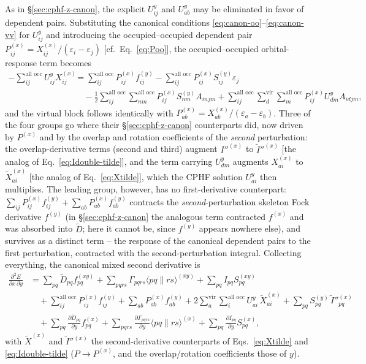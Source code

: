 \documentclass[12pt]{article}
\newcommand{\adb}[2]{\langle #1 \| #2 \rangle}
\newcommand{\vir}{\text{vir}}
\newcommand{\alloc}{\text{all occ}}   %
\begin{document}
As in \S\ref{sec:cphf-z-canon}, the explicit $U^y_{ij}$ and $U^y_{ab}$ may be eliminated in favor of
dependent pairs.  Substituting the canonical conditions \eqref{eq:canon-oo}--\eqref{eq:canon-vv}
for $U^y_{ij}$ and introducing the occupied--occupied dependent pair
$P^{(x)}_{ij}=X^{(x)}_{ij}/(\varepsilon_i-\varepsilon_j)$ [cf.\ Eq.~\eqref{eq:Poo}],
the occupied--occupied orbital-response term becomes
\begin{align}
-\sum_{ij}^{\alloc}U^y_{ij}X^{(x)}_{ij}
&= \sum_{ij}^{\alloc}P^{(x)}_{ij}f^{(y)}_{ij}
- \sum_{ij}^{\alloc}P^{(x)}_{ij}S^{(y)}_{ij}\varepsilon_j
\nonumber\\
&\quad
- \tfrac12\sum_{ij}^{\alloc}\sum_{nm}^{\alloc}P^{(x)}_{ij}S^{(y)}_{nm}A_{injm}
+ \sum_{ij}^{\alloc}\sum_{d}^{\vir}\sum_{m}^{\alloc}P^{(x)}_{ij}U^y_{dm}A_{idjm},
\label{eq:oo-sub-2}
\end{align}
and the virtual block follows identically with
$P^{(x)}_{ab}=X^{(x)}_{ab}/(\varepsilon_a-\varepsilon_b)$.  Three of the four
groups go where their \S\ref{sec:cphf-z-canon} counterparts did, now driven by $P^{(x)}$ and by the
overlap and rotation coefficients of the {\em second} perturbation: the
overlap-derivative terms (second and third) augment $I''^{(x)}$ to
$\tilde I''^{(x)}$ [the analog of Eq.~\eqref{eq:Idouble-tilde}], and the term
carrying $U^y_{dm}$ augments $X^{(x)}_{ai}$ to $\tilde X^{(x)}_{ai}$ [the analog
of Eq.~\eqref{eq:Xtilde}], which the CPHF solution $U^y_{ai}$ then multiplies.
The leading group, however, has no first-derivative counterpart:
$\sum_{ij}P^{(x)}_{ij}f^{(y)}_{ij}+\sum_{ab}P^{(x)}_{ab}f^{(y)}_{ab}$ contracts the
{\em second}-perturbation skeleton Fock derivative $f^{(y)}$ (in \S\ref{sec:cphf-z-canon} the analogous
term contracted $f^{(x)}$ and was absorbed into $\tilde D$; here it cannot be,
since $f^{(y)}$ appears nowhere else), and survives as a distinct term -- the
response of the canonical dependent pairs to the first perturbation, contracted
with the second-perturbation integral.  Collecting everything, the canonical
mixed second derivative is
\begin{align}
\frac{\partial^2 E}{\partial x\,\partial y}
&= \sum_{pq}\tilde D_{pq} f^{(xy)}_{pq}
+ \sum_{pqrs}\Gamma_{pqrs}\adb{pq}{rs}^{(xy)}
+ \sum_{pq} I_{pq} S^{(xy)}_{pq}
\nonumber\\
&\quad
+ \sum_{ij}^{\alloc}P^{(x)}_{ij}f^{(y)}_{ij}
+ \sum_{ab}P^{(x)}_{ab}f^{(y)}_{ab}
+ 2\sum_{a}^{\vir}\sum_{i}^{\alloc} U^y_{ai}\,\tilde X^{(x)}_{ai}
+ \sum_{pq} S^{(y)}_{pq}\,\tilde I''^{(x)}_{pq}
\nonumber\\
&\quad
+ \sum_{pq}\frac{\partial \tilde D_{pq}}{\partial y} f^{(x)}_{pq}
+ \sum_{pqrs}\frac{\partial \Gamma_{pqrs}}{\partial y}\adb{pq}{rs}^{(x)}
+ \sum_{pq}\frac{\partial I_{pq}}{\partial y} S^{(x)}_{pq},
\label{eq:d2E-canon-final}
\end{align}
with $\tilde X^{(x)}$ and $\tilde I''^{(x)}$ the second-derivative counterparts of
Eqs.~\eqref{eq:Xtilde} and \eqref{eq:Idouble-tilde} ($P\to P^{(x)}$, and the
overlap/rotation coefficients those of $y$).
\end{document}
